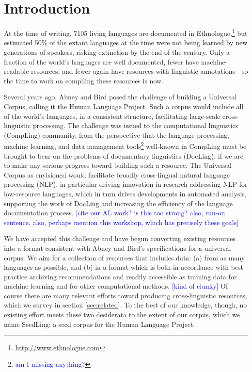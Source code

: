 \section{Introduction} \label{sec:intro}

At the time of writing, 7105 living languages are documented in Ethnologue,\footnote{\url{http://www.ethnologue.com}} but  estimated 50\% of the extant languages at the time were not being learned by new generations of speakers, risking extinction by the end of the century. Only a fraction of the world's languages are well documented, fewer have machine-readable resources, and fewer again have resources with linguistic annotations \cite{maxwell2006annotation} - so the time to work on compiling these resources is now.

Several years ago, Abney and Bird  posed the challenge of building a Universal Corpus, calling it the Human Language Project. Such a corpus would include all of the world's languages, in a consistent structure, facilitating large-scale cross-linguistic processing. The challenge was issued to the computational linguistics (CompLing) community, from the perspective that the language processing, machine learning, and data management tools\footnote{\textcolor{blue}{am I missing anything?}} well-known in CompLing must be brought to bear on the problems of documentary linguistics (DocLing), if we are to make any serious progress toward building such a resource. The Universal Corpus as envisioned would facilitate broadly cross-lingual natural language processing (NLP), in particular driving innovation in research addressing NLP for low-resource languages, which in turn drives developments in automated analysis, supporting the work of DocLing and increasing the efficiency of the language documentation process. \textcolor{blue}{[cite our AL work? is this too strong? also, run-on sentence. also, perhaps mention this workshop, which has precisely these goals]}

We have accepted this challenge and have begun converting existing resources into a format consistent with Abney and Bird's specifications for a universal corpus. We aim for a collection of resources that includes data: (a) from as many languages as possible, and (b) in a format which is both in accordance with best practice archiving recommendations and readily accessible as training data for machine learning and for other computational methods. \textcolor{blue}{[kind of clunky]} Of course there are many relevant efforts toward producing cross-linguistic resources, which we survey in section \ref{sec:related}. To the best of our knowledge, though, no existing effort meets these two desiderata to the extent of our corpus, which we name SeedLing: a seed corpus for the Human Language Project.

